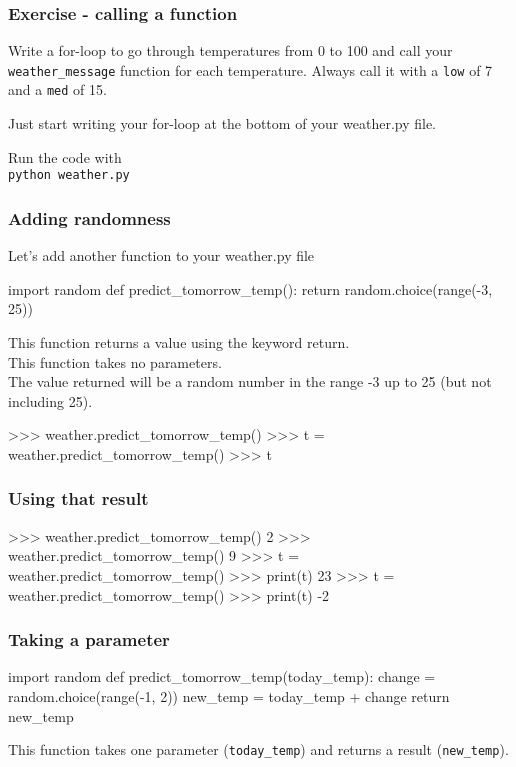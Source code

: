 \documentclass{beamer}
\begin{document}
\begin{frame}[fragile]
\frametitle{Exercise - calling a function}

Write a for-loop to go through temperatures from 0 to
100 and call your \texttt{weather\_message} function for
each temperature. Always call it with a \texttt{low} of 7 and a
\texttt{med} of 15.
\bigskip

Just start writing your for-loop at the bottom of your
weather.py file.
\bigskip

Run the code with\\
\texttt{python weather.py}
\end{frame}


\begin{frame}[fragile]
\frametitle{Adding randomness}
Let's add another function to your weather.py file
\begin{shaded}
\begin{code}
import random
def predict_tomorrow_temp():
   return random.choice(range(-3, 25))
\end{code}
\end{shaded}

This function returns a value using the keyword return.\\
This function takes no parameters.\\
The value returned will be a random number in the range -3
up to 25 (but not including 25).\\
\begin{code}
>>> weather.predict_tomorrow_temp()
>>> t = weather.predict_tomorrow_temp()
>>> t
\end{code}
\end{frame}

\begin{frame}[fragile]
\frametitle{Using that result}
\begin{code}
>>> weather.predict_tomorrow_temp()
2
>>> weather.predict_tomorrow_temp()
9
>>> t = weather.predict_tomorrow_temp()
>>> print(t)
23
>>> t = weather.predict_tomorrow_temp()
>>> print(t)
-2
\end{code}
\end{frame}

\begin{frame}[fragile]
\frametitle{Taking a parameter}
\begin{shaded}
\begin{code}
import random
def predict_tomorrow_temp(today_temp):
   change = random.choice(range(-1, 2))
   new_temp = today_temp + change
   return new_temp
\end{code}
\end{shaded}
This function takes one parameter (\texttt{today\_temp})
and returns a result (\texttt{new\_temp}).
\end{frame}
\end{document}

